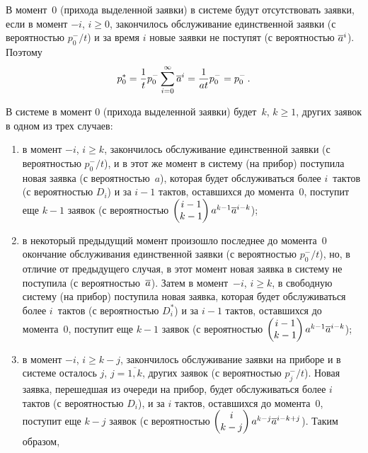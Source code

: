 \begin{multicols}{2}
В момент~0 (прихода выделенной заявки) в сис\-те\-ме будут
отсутствовать заявки, если в момент $-i$, $i\ge 0$,
закончилось обслуживание единственной заявки (с
вероятностью $p^-_0/t$) и за время $i$ новые заявки
не поступят (с вероятностью $\overline a^i$).
Поэтому
$$
p_0^* = \displaystyle\frac{\displaystyle 1\mathstrut}{\displaystyle t\mathstrut} p_{0}^- \sum_{i=0}^{\infty} \overline a^{i}
= \displaystyle\frac{\displaystyle 1\mathstrut}{\displaystyle at\mathstrut} p_{0}^- = p_{0}^-\,.
$$

В системе в момент 0 (прихода выделенной заявки) будет~$k$, $k\ge
1$, других заявок в одном из трех случаев:
\begin{enumerate}[(1)]
\item в момент $-i$, $i\ge k$, закончилось обслуживание
единственной заявки (с вероятностью $p^-_0/t$), и в этот
же момент в систему (на прибор) поступила новая заявка
(с ве\-ро\-ят\-ностью~$a$), которая будет обслуживаться более
$i$~тактов (с вероятностью $D_i$) и за $i-1$ тактов,
оставшихся до момента~0, поступит еще $k-1$ заявок
(с вероятностью $\begin{pmatrix}
i-1 \\ k-1\end{pmatrix} a^{k-1} \overline a^{i-k}$);
\item
в некоторый предыдущий момент произошло последнее
до момента~0 окончание обслуживания единственной заявки
(с вероятностью $p^-_0/t$), но, в отличие от предыдущего
случая, в этот момент новая заявка в систему не
поступила (с вероятностью~$\overline a$).
Затем в момент~$-i$, $i\ge k$, в свободную систему (на прибор)
поступила новая заявка, которая будет обслуживаться более
$i$~тактов (с вероятностью $D^*_i$) и за $i-1$ тактов,
оставшихся до момента~0, поступит еще $k-1$ заявок
(с вероятностью $\begin{pmatrix}i-1 \\ k-1\end{pmatrix} a^{k-1} \overline a^{i-k}$);
\item
в момент $-i$, $i\ge k-j$, закончилось обслуживание
заявки на приборе и в системе осталось
$j$, $j=\overline{1,k}$, других заявок (с вероятностью
$p^-_j/t$).
Новая заявка, перешедшая из очереди на прибор, будет
обслуживаться более
$i$ тактов (с вероятностью $D_i$), и за $i$ тактов,
оставшихся до момента~0, поступит еще $k-j$ заявок
(с вероятностью $\begin{pmatrix}i \\ k-j\end{pmatrix} a^{k-j} \overline a^{i-k+j}$).
Таким образом,


\end{enumerate}
\end{multicols}
